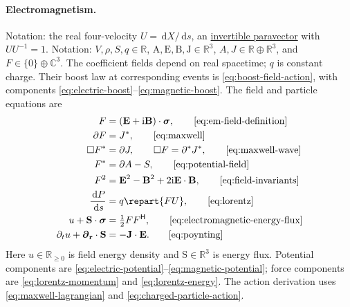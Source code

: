 \documentclass[11pt]{article}
\newcommand{\pv}[1]{{#1}}
\newcommand{\pvGreek}[1]{{#1}}
\newcommand{\vstyle}[1]{{\bm{\mathrm{#1}}}}
\newcommand{\pA}{\pv{A}}
\newcommand{\pF}{\pv{F}}
\newcommand{\pJ}{\pv{J}}
\newcommand{\pP}{\pv{P}}
\newcommand{\pU}{\pv{U}}
\newcommand{\pX}{\pv{X}}
\newcommand{\pvpartial}{\pvGreek{\partial}}
\numberwithin{equation}{section}
\newcommand{\R}{\mathbb{R}}
\newcommand{\C}{\mathbb{C}}
\newcommand{\ii}{\mathrm{i}}
\newcommand{\dotprod}{\cdot}
\newcommand{\bsig}{\vstyle{\sigma}}
\newcommand{\bA}{\vstyle{A}}
\newcommand{\br}{\vstyle{r}}
\newcommand{\bS}{\vstyle{S}}
\newcommand{\bE}{\vstyle{E}}
\newcommand{\bBf}{\vstyle{B}}
\newcommand{\bJ}{\vstyle{J}}
\newcommand{\pdr}{\vstyle{\partial}_{\br}}
\newcommand{\dd}{\,\mathrm d}
\begin{document}
\paragraph{Electromagnetism.}
Notation: the real four-velocity $\pU=\dd \pX/\dd s$, an
\hyperref[eq:unit-paravector]{invertible paravector} with $\pU \pU^{-1}=1$.
Notation: $V,\rho,S,q\in\R$, $\bA,\bE,\bBf,\bJ\in\R^3$,
$\pA,\pJ\in\R\oplus\R^3$, and
$\pF\in\{0\}\oplus\C^3$.
The coefficient fields depend on real spacetime; $q$ is constant charge.
Their boost law at corresponding events is \eqref{eq:boost-field-action},
with components \eqref{eq:electric-boost}--\eqref{eq:magnetic-boost}.
The field and particle equations are
\begin{align*}
 \pF&=(\bE+\ii\bBf)\dotprod\bsig,
   \tag*{\eqref{eq:em-field-definition}}\\
 \pvpartial \pF&=\pJ^*,
   \tag*{\eqref{eq:maxwell}}\\
 \Box \pF^*&=\pvpartial \pJ,\qquad \Box \pF=\pvpartial^*\pJ^*,
   \tag*{\eqref{eq:maxwell-wave}}\\
 \pF^*&=\pvpartial \pA-S,
   \tag*{\eqref{eq:potential-field}}\\
 \pF^2&=\bE^2-\bBf^2+2\ii\bE\dotprod\bBf,
   \tag*{\eqref{eq:field-invariants}}\\
 \frac{\dd \pP}{\dd s}&=q\repart{\pF \pU},
   \tag*{\eqref{eq:lorentz}}\\
 u+\bS\dotprod\bsig&=\tfrac12\pF\pF^{\mathsf H},
   \tag*{\eqref{eq:electromagnetic-energy-flux}}\\
 \partial_tu+\pdr\dotprod\bS&=-\bJ\dotprod\bE.
   \tag*{\eqref{eq:poynting}}
\end{align*}
Here $u\in\R_{\ge0}$ is field energy density and $\bS\in\R^3$ is energy flux.
Potential components are \eqref{eq:electric-potential}--\eqref{eq:magnetic-potential};
force components are \eqref{eq:lorentz-momentum} and \eqref{eq:lorentz-energy}.
The action derivation uses \eqref{eq:maxwell-lagrangian} and
\eqref{eq:charged-particle-action}.

\end{document}
